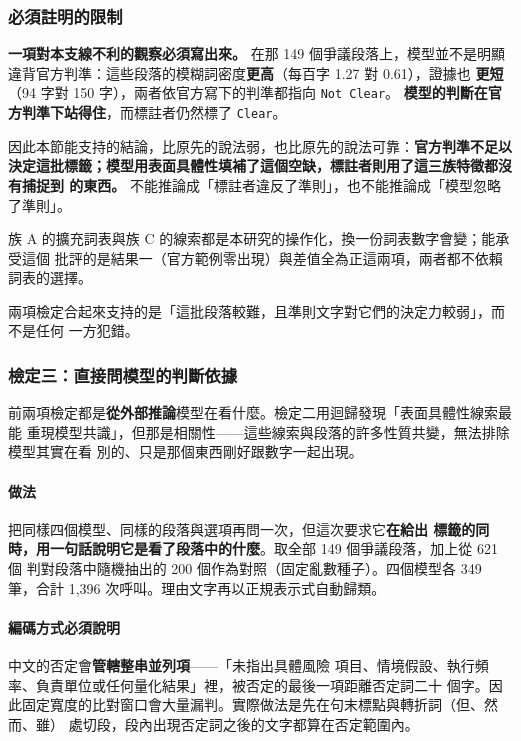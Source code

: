 \documentclass[11pt,a4paper]{ctexart}
\newcommand{\fn}[1]{\texttt{#1}}
\begin{document}
\subsubsection{必須註明的限制}

\textbf{一項對本支線不利的觀察必須寫出來。} 在那 149 個爭議段落上，模型並不是明顯
違背官方判準：這些段落的模糊詞密度\textbf{更高}（每百字 1.27 對 0.61），證據也
\textbf{更短}（94 字對 150 字），兩者依官方寫下的判準都指向 \fn{Not Clear}。
\textbf{模型的判斷在官方判準下站得住}，而標註者仍然標了 \fn{Clear}。

因此本節能支持的結論，比原先的說法弱，也比原先的說法可靠：\textbf{官方判準不足以
決定這批標籤；模型用表面具體性填補了這個空缺，標註者則用了這三族特徵都沒有捕捉到
的東西。} 不能推論成「標註者違反了準則」，也不能推論成「模型忽略了準則」。

族 A 的擴充詞表與族 C 的線索都是本研究的操作化，換一份詞表數字會變；能承受這個
批評的是結果一（官方範例零出現）與差值全為正這兩項，兩者都不依賴詞表的選擇。

兩項檢定合起來支持的是「這批段落較難，且準則文字對它們的決定力較弱」，而不是任何
一方犯錯。

\subsubsection{檢定三：直接問模型的判斷依據}
\label{sec:reasons}

前兩項檢定都是\textbf{從外部推論}模型在看什麼。檢定二用迴歸發現「表面具體性線索最能
重現模型共識」，但那是相關性——這些線索與段落的許多性質共變，無法排除模型其實在看
別的、只是那個東西剛好跟數字一起出現。

\paragraph{做法} 把同樣四個模型、同樣的段落與選項再問一次，但這次要求它\textbf{在給出
標籤的同時，用一句話說明它是看了段落中的什麼}。取全部 149 個爭議段落，加上從 621 個
判對段落中隨機抽出的 200 個作為對照（固定亂數種子）。四個模型各 349 筆，合計 1{,}396
次呼叫。理由文字再以正規表示式自動歸類。

\paragraph{編碼方式必須說明} 中文的否定會\textbf{管轄整串並列項}——「未指出具體風險
項目、情境假設、執行頻率、負責單位或任何量化結果」裡，被否定的最後一項距離否定詞二十
個字。因此固定寬度的比對窗口會大量漏判。實際做法是先在句末標點與轉折詞（但、然而、雖）
處切段，段內出現否定詞之後的文字都算在否定範圍內。
\end{document}
